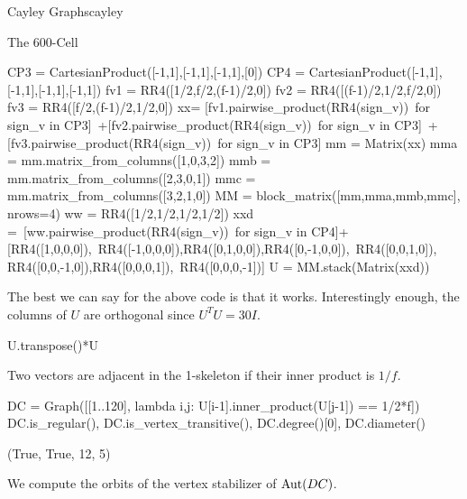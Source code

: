 \begin{chap}{Cayley Graphs}{cayley}
\begin{sect}{The 600-Cell}
%
\begin{sagecode}
\begin{sageinput}
CP3 = CartesianProduct([-1,1],[-1,1],[-1,1],[0])
CP4 = CartesianProduct([-1,1],[-1,1],[-1,1],[-1,1])
fv1 = RR4([1/2,f/2,(f-1)/2,0])
fv2 = RR4([(f-1)/2,1/2,f/2,0])
fv3 = RR4([f/2,(f-1)/2,1/2,0])
xx= [fv1.pairwise_product(RR4(sign_v))\
    for sign_v in CP3]\
    +[fv2.pairwise_product(RR4(sign_v))\
    for sign_v in CP3]\
    +[fv3.pairwise_product(RR4(sign_v))\
    for sign_v in CP3]
mm = Matrix(xx)
mma = mm.matrix_from_columns([1,0,3,2])
mmb = mm.matrix_from_columns([2,3,0,1])
mmc = mm.matrix_from_columns([3,2,1,0])
MM = block_matrix([mm,mma,mmb,mmc], nrows=4)
ww = RR4([1/2,1/2,1/2,1/2])
xxd =\ 
    [ww.pairwise_product(RR4(sign_v))\
    for sign_v in CP4]+[RR4([1,0,0,0]),\  
    RR4([-1,0,0,0]),RR4([0,1,0,0]),RR4([0,-1,0,0]),\ 
    RR4([0,0,1,0]), RR4([0,0,-1,0]),RR4([0,0,0,1]),\
    RR4([0,0,0,-1])]
U = MM.stack(Matrix(xxd))
\end{sageinput}
\end{sagecode}
%
\begin{para}
The best we can say for the above code is that it works. Interestingly
enough, the columns of $U$ are orthogonal since $U^TU =30I$.
\end{para}
%
\begin{sagecode}
\begin{sageinput}
U.transpose()*U
\end{sageinput}
\begin{sageoutput}
[30  0  0  0]
[ 0 30  0  0]
[ 0  0 30  0]
[ 0  0  0 30]
\end{sageoutput}
\end{sagecode}
%
\begin{para}
Two vectors are adjacent in the 1-skeleton if their inner product is $1/f$.
\end{para}
%
\begin{sagecode}
\begin{sageinput}
DC = Graph([[1..120], lambda i,j: U[i-1].inner_product(U[j-1]) == 1/2*f])
DC.is_regular(), DC.is_vertex_transitive(), DC.degree()[0], DC.diameter()
\end{sageinput}
\begin{sageoutput}
(True, True, 12, 5)
\end{sageoutput}
\end{sagecode}
%
\begin{para}
We compute the orbits of the vertex stabilizer of $\mathrm{Aut}(DC)$.
\end{para}
%
\begin{sagecode}

\end{sagecode}
\end{sect}
\end{chap}
